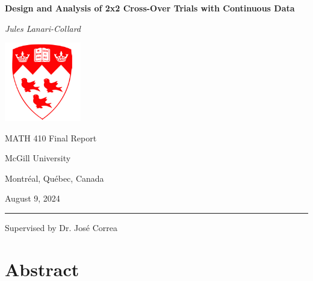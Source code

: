 \documentclass[12pt, TexShade, letterpaper]{report}
\begin{document}
\begin{titlepage}
		\begin{center}
			\vspace*{0.5cm}

			\LARGE
			\textbf{Design and Analysis of 2x2 Cross-Over Trials with Continuous Data}
			
			\vspace{1cm}
			
			\textit{Jules Lanari-Collard}
			
			\vspace{1.2cm}
			
			\includegraphics[width=0.25\textwidth]{mcglogo.png}
			
			\Large
			MATH 410 Final Report
			
			\vspace{-5mm}
			McGill University
			
			\vspace{-5mm}
			Montr\'eal, Qu\'ebec, Canada
			
			\vspace{5mm}
			August 9, 2024
			\small
			\vspace{0.5cm}
			{\color{red} \hrule height 0.75mm}
			
			\vspace{0.2cm}
			
			Supervised by Dr. José Correa
		\end{center}
\end{titlepage}

\setlength{\voffset}{2cm}
\renewcommand{\chaptermark}[1]{%
	\markboth{\thechapter.\ #1}{}}
\chapter*{Abstract}
	\label{chap:engAbstract}

	\tableofcontents\thispagestyle{plain}

 	\clearpage

\end{document}
